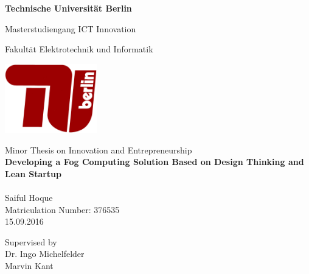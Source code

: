 \thispagestyle{empty}
\begin{center}

\vspace*{1.4cm}
{\LARGE \textbf{Technische Universit{\"a}t Berlin}}

\vspace{0.5cm}

{\large Masterstudiengang ICT Innovation\\[1mm]}

Fakultät Elektrotechnik und Informatik\\

\vspace*{1cm}

\includegraphics[width=4cm]{./img/tu_logo.jpg}

\vspace*{1.0cm}

{\LARGE Minor Thesis on Innovation and Entrepreneurship}\\

\vspace{1.0cm}
{\LARGE \textbf{Developing a Fog Computing Solution Based on Design Thinking and Lean Startup }}\\
\vspace*{0.3cm}
{\LARGE \textbf{}}\\
\vspace*{1.0cm}
{\LARGE Saiful Hoque}
\\
\vspace*{0.5cm}
Matriculation Number: 376535\\
15.09.2016\\ %
\vspace*{1.0cm}

Supervised by\\ 
\vspace*{0.5cm}
Dr. Ingo Michelfelder\\
\vspace*{0.5cm}
Marvin Kant

\vspace{3cm}


\end{center}

